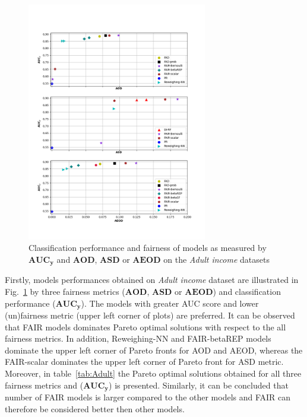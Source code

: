 \documentclass[preprint,12pt]{elsarticle}
\begin{document}
\begin{figure}
	\center
	\includegraphics[angle=0, width=0.7\textwidth]{Adult.png}
	\captionsetup{justification=centering}
	\caption{Classification performance and fairness of models as measured by $\mathbf{AUC_y}$ and $\mathbf{AOD}$, $\mathbf{ASD}$ or $\mathbf{AEOD}$ on the \textit{Adult income} datasets}
	\label{fig:Adult}
	\vskip -0.2in
\end{figure}

Firstly, models performances obtained on \textit{Adult income} dataset are illustrated in Fig.~\ref{fig:Adult} by three fairness metrics ($\mathbf{AOD}$, $\mathbf{ASD}$ or $\mathbf{AEOD}$) and classification performance ($\mathbf{AUC_y}$). The models with greater AUC score and lower (un)fairness metric (upper left corner of plots) are preferred. It can be observed that FAIR models dominates Pareto optimal solutions with respect to the all fairness metrics. In addition, Reweighing-NN and FAIR-betaREP models dominate the upper left corner of Pareto fronts for AOD and AEOD, whereas the FAIR-scalar dominates the upper left corner of Pareto front for ASD metric. Moreover, in table~\ref{tab:Adult} the Pareto optimal solutions obtained for all three fairness metrics and ($\mathbf{AUC_y}$) is presented. Similarly, it can be concluded that number of FAIR models is larger compared to the other models and FAIR can therefore be considered better then other models.
\end{document}
